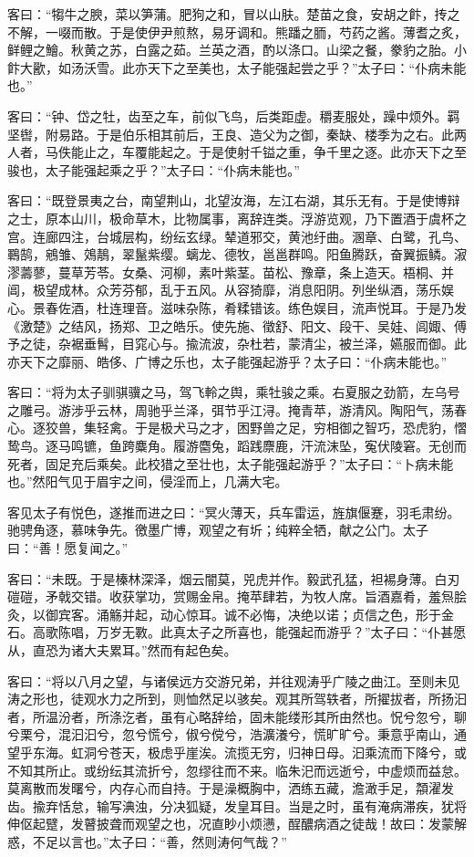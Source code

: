 \documentclass[UTF8,titlepage,oneside]{ctexbook}
\begin{document}
客曰：“犓牛之腴，菜以笋蒲。肥狗之和，冒以山肤。楚苗之食，安胡之飰，抟之不解，一啜而散。于是使伊尹煎熬，易牙调和。熊蹯之胹，芍药之酱。薄耆之炙，鲜鲤之鱠。秋黄之苏，白露之茹。兰英之酒，酌以涤口。山梁之餐，豢豹之胎。小飰大歠，如汤沃雪。此亦天下之至美也，太子能强起尝之乎？”太子曰：“仆病未能也。”


客曰：“钟、岱之牡，齿至之车，前似飞鸟，后类距虚。穱麦服处，躁中烦外。羁坚辔，附易路。于是伯乐相其前后，王良、造父为之御，秦缺、楼季为之右。此两人者，马佚能止之，车覆能起之。于是使射千镒之重，争千里之逐。此亦天下之至骏也，太子能强起乘之乎？”太子曰：“仆病未能也。”


客曰：“既登景夷之台，南望荆山，北望汝海，左江右湖，其乐无有。于是使博辩之士，原本山川，极命草木，比物属事，离辞连类。浮游览观，乃下置酒于虞杯之宫。连廊四注，台城层构，纷纭玄绿。辇道邪交，黄池纡曲。溷章、白鹭，孔鸟、鶤鹄，鵷雏、鵁鶄，翠鬣紫缨。螭龙、德牧，邕邕群鸣。阳鱼腾跃，奋翼振鳞。漃漻薵蓼，蔓草芳苓。女桑、河柳，素叶紫茎。苗松、豫章，条上造天。梧桐、并阊，极望成林。众芳芬郁，乱于五风。从容猗靡，消息阳阴。列坐纵酒，荡乐娱心。景春佐酒，杜连理音。滋味杂陈，肴糅错该。练色娱目，流声悦耳。于是乃发《激楚》之结风，扬郑、卫之皓乐。使先施、徵舒、阳文、段干、吴娃、闾娵、傅予之徒，杂裾垂髾，目窕心与。揄流波，杂杜若，蒙清尘，被兰泽，嬿服而御。此亦天下之靡丽、皓侈、广博之乐也，太子能强起游乎？太子曰：“仆病未能也。”


客曰：“将为太子驯骐骥之马，驾飞軨之舆，乘牡骏之乘。右夏服之劲箭，左乌号之雕弓。游涉乎云林，周驰乎兰泽，弭节乎江浔。掩青苹，游清风。陶阳气，荡春心。逐狡兽，集轻禽。于是极犬马之才，困野兽之足，穷相御之智巧，恐虎豹，慴鸷鸟。逐马鸣镳，鱼跨麋角。履游麕兔，蹈践麖鹿，汗流沫坠，寃伏陵窘。无创而死者，固足充后乘矣。此校猎之至壮也，太子能强起游乎？”太子曰：“卜病未能也。”然阳气见于眉宇之间，侵淫而上，几满大宅。


客见太子有悦色，遂推而进之曰：“冥火薄天，兵车雷运，旌旗偃蹇，羽毛肃纷。驰骋角逐，慕味争先。徼墨广博，观望之有圻；纯粹全牺，献之公门。太子曰：“善！愿复闻之。”


客曰：“未既。于是榛林深泽，烟云闇莫，兕虎并作。毅武孔猛，袒裼身薄。白刃磑磑，矛戟交错。收获掌功，赏赐金帛。掩苹肆若，为牧人席。旨酒嘉肴，羞炰脍灸，以御宾客。涌觞并起，动心惊耳。诚不必悔，决绝以诺；贞信之色，形于金石。高歌陈唱，万岁无斁。此真太子之所喜也，能强起而游乎？”太子曰：“仆甚愿从，直恐为诸大夫累耳。”然而有起色矣。


客曰：“将以八月之望，与诸侯远方交游兄弟，并往观涛乎广陵之曲江。至则未见涛之形也，徒观水力之所到，则恤然足以骇矣。观其所驾轶者，所擢拔者，所扬汩者，所温汾者，所涤汔者，虽有心略辞给，固未能缕形其所由然也。怳兮忽兮，聊兮栗兮，混汩汩兮，忽兮慌兮，俶兮傥兮，浩瀇瀁兮，慌旷旷兮。秉意乎南山，通望乎东海。虹洞兮苍天，极虑乎崖涘。流揽无穷，归神日母。汩乘流而下降兮，或不知其所止。或纷纭其流折兮，忽缪往而不来。临朱汜而远逝兮，中虚烦而益怠。莫离散而发曙兮，内存心而自持。于是澡概胸中，洒练五藏，澹澉手足，頮濯发齿。揄弃恬怠，输写淟浊，分决狐疑，发皇耳目。当是之时，虽有淹病滞疾，犹将伸伛起躄，发瞽披聋而观望之也，况直眇小烦懑，酲醲病酒之徒哉！故曰：发蒙解惑，不足以言也。”太子曰：“善，然则涛何气哉？”
\end{document}
